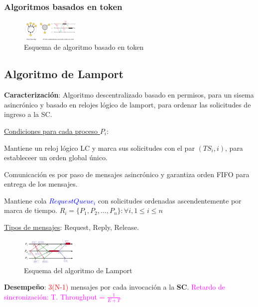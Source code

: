 \subsubsection{Algoritmos basados en token}

\begin{figure}[H]
    \centering
    \includegraphics[width=0.25\textwidth]{img/Algoritmos_token.png}
    \caption{Esquema de algoritmo basado en token}
\end{figure}

\subsection{Algoritmo de Lamport} 

\textbf{Caracterización}: Algoritmo descentralizado basado en permisos, para un sisema asincrónico y basado en relojes lógico de lamport, para ordenar las solicitudes de ingreso a la SC.

\vspace{0.5em}
\underline{Condiciones para cada proceso $P_i$}: 

Mantiene un reloj lógico LC y marca sus solicitudes con el par $(TS_i, i)$, para estableceer un orden global único. 

Comunicación es por paso de mensajes asincrónico y garantiza orden FIFO para entrega de los mensajes. 

Mantiene cola \textcolor{blue}{$RequestQueue_i$} con solicitudes ordenadas ascendentemente por marca de tiempo. $R_i = \{P_1, P_2, \ldots, P_n\} : \forall i, 1 \leq i \leq n$

\vspace{0.5em}

\underline{Tipos de mensajes}: Request, Reply, Release.

\begin{figure}[H]
    \centering
    \includegraphics[width=0.25\textwidth]{img/A_Lamport.png}
    \caption{Esquema del algoritmo de Lamport}
\end{figure}

\textbf{Desempeño}: \textcolor{red}{3(N-1)} mensajes por cada invocación a la \textbf{SC}. \textcolor{magenta}{Retardo de sincronización: T. Throughput = $\frac{1}{E+T}$}

